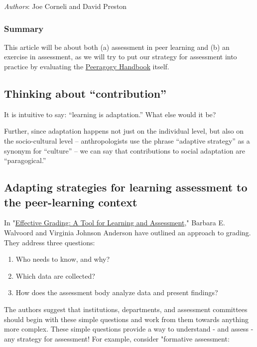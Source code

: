 \emph{Authors}: Joe Corneli and David Preston

\subsubsection{Summary}

This article will be about both (a) assessment in peer learning and (b)
an exercise in assessment, as we will try to put our strategy for
assessment into practice by evaluating the
\href{http://peeragogy.org}{Peeragogy Handbook} itself.

\subsection{Thinking about ``contribution''}

It is intuitive to say: ``learning is adaptation.'' What else would it
be?

Further, since adaptation happens not just on the individual level, but
also on the socio-cultural level -- anthropologists use the phrase
``adaptive strategy'' as a synonym for ``culture'' -- we can say that
contributions to social adaptation are ``paragogical.''

\subsection{Adapting strategies for learning assessment to the
peer-learning context}

In
"\href{http://books.google.com/books?id=EJxy06yX\_NoC\&printsec=frontcover\&source=gbs\_atb\#v=onepage\&q\&f=false}{Effective
Grading: A Tool for Learning and Assessment}," Barbara E. Walvoord and
Virginia Johnson Anderson have outlined an approach to grading. They
address three questions:

\begin{enumerate}
\item
  Who needs to know, and why?
\item
  Which data are collected?
\item
  How does the assessment body analyze data and present findings?
\end{enumerate}

The authors suggest that institutions, departments, and assessment
committees should begin with these simple questions and work from them
towards anything more complex. These simple questions provide a way to
understand - and assess - any strategy for assessment! For example,
consider "formative assessment:

